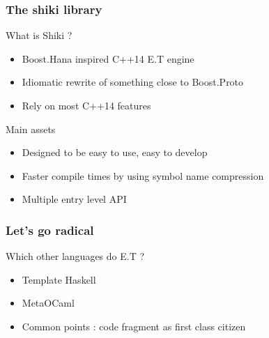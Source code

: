 \begin{frame}
\frametitle{The shiki library}
\begin{block}{What is Shiki ?}
\begin{itemize}
\item Boost.Hana inspired C++14 E.T engine
\item Idiomatic rewrite of something close to Boost.Proto
\item Rely on most C++14 features
\end{itemize}
\end{block}{}

\begin{block}{Main assets}
\begin{itemize}
\item Designed to be easy to use, easy to develop
\item Faster compile times by using symbol name compression
\item Multiple entry level API
\end{itemize}
\end{block}{}
\end{frame}

\begin{frame}
\frametitle{Let's go radical}
\begin{block}{Which other languages do E.T ?}
\begin{itemize}
\item Template Haskell
\item MetaOCaml
\item Common points : code fragment as first class citizen
\end{itemize}
\end{block}{}

\lstfragment

\end{frame}